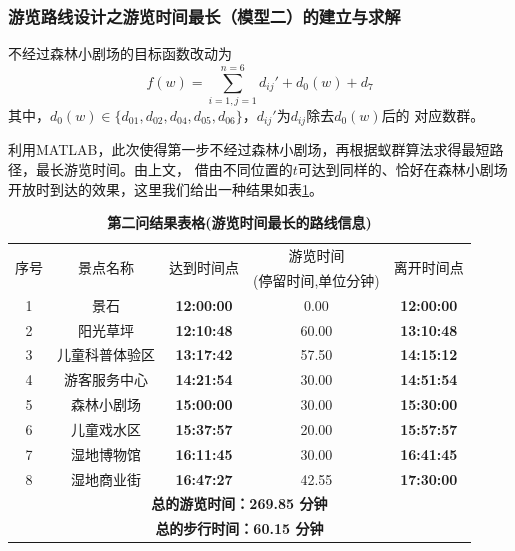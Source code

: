 \documentclass[hyperref,UTF8]{article}
\begin{document}
{\subsubsection{游览路线设计之游览时间最长（模型二）的建立与求解}
不经过森林小剧场的目标函数改动为
\begin{equation}\label{wenti21}
f(w)=\sum_{i=1,j=1}^{n=6}d_{ij}'+d_{0}(w)+d_{7}
\end{equation}
其中，$d_0(w)\in \{d_{01},d_{02},d_{04},d_{05},d_{06}\}$，$d_{ij}'$为$d_{ij}$除去$d_0(w)$后的
对应数群。

利用MATLAB，此次使得第一步不经过森林小剧场，再根据蚁群算法求得最短路径，最长游览时间。由上文，
借由不同位置的$t$可达到同样的、恰好在森林小剧场开放时到达的效果，这里我们给出一种结果如表\ref{tab:addlabel2}。


\begin{table}[htbp]
  \centering
  \caption{\textbf{第二问结果表格(游览时间最长的路线信息)}}
    \begin{tabular}{|c|c|c|c|c|}
\hline
    \multicolumn{1}{|c|}{\multirow{2}[0]{*}{序号}} & \multicolumn{1}{c|}{\multirow{2}[0]{*}{景点名称}} & \multicolumn{1}{c|}{\multirow{2}[0]{*}{达到时间点}} & 游览时间  & \multicolumn{1}{c|}{\multirow{2}[0]{*}{离开时间点}} \\
          &       &       & (停留时间,单位分钟) &  \\
\hline
    1     & 景石    & \textbf{12:00:00} & 0.00  & \textbf{12:00:00} \\
\hline
    2     & 阳光草坪  & \textbf{12:10:48} & 60.00  & \textbf{13:10:48} \\
\hline
    3     & 儿童科普体验区 & \textbf{13:17:42} & 57.50  & \textbf{14:15:12} \\
\hline
    4     & 游客服务中心 & \textbf{14:21:54} & 30.00  & \textbf{14:51:54} \\
    \hline
    5     & 森林小剧场 & \textbf{15:00:00} & 30.00  & \textbf{15:30:00} \\
    \hline
    6     & 儿童戏水区 & \textbf{15:37:57} & 20.00  & \textbf{15:57:57}\\
    \hline
    7     & 湿地博物馆 & \textbf{16:11:45} & 30.00  & \textbf{16:41:45}\\
    \hline
    8     & 湿地商业街 & \textbf{16:47:27} & 42.55  & \textbf{17:30:00} \\
\hline
\multicolumn{5}{|c|}{\textbf{总的游览时间：269.85 分钟}}\\
\hline
\multicolumn{5}{|c|}{\textbf{总的步行时间：60.15  分钟}}\\ 
\hline
    \end{tabular}%
  \label{tab:addlabel2}%
\end{table}%

}
\end{document}
